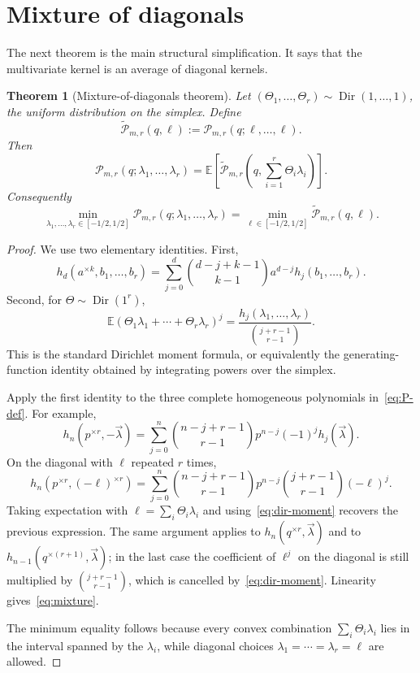 \documentclass[11pt]{article}
\newtheorem{theorem}{Theorem}[section]
\newcommand{\E}{\mathbb E}
\newcommand{\Pcal}{\mathcal P}
\newcommand{\wtP}{\widetilde{\mathcal P}}
\newcommand{\Dir}{\operatorname{Dir}}
\begin{document}
\section{Mixture of diagonals}

The next theorem is the main structural simplification.  It says that the multivariate kernel is an average of diagonal kernels.

\begin{theorem}[Mixture-of-diagonals theorem]\label{thm:mixture}
Let $(\Theta_1,\ldots,\Theta_r)\sim\Dir(1,\ldots,1)$, the uniform distribution on the simplex.  Define
\[
        \wtP_{m,r}(q,\ell):=\Pcal_{m,r}(q;\ell,\ldots,\ell).
\]
Then
\begin{equation}\label{eq:mixture}
        \Pcal_{m,r}(q;\lambda_1,\ldots,\lambda_r)
        =\E\left[\wtP_{m,r}\left(q,\sum_{i=1}^r\Theta_i\lambda_i\right)\right].
\end{equation}
Consequently
\[
        \min_{\lambda_1,\ldots,\lambda_r\in[-1/2,1/2]}
        \Pcal_{m,r}(q;\lambda_1,\ldots,\lambda_r)
        =\min_{\ell\in[-1/2,1/2]}\wtP_{m,r}(q,\ell).
\]
\end{theorem}

\begin{proof}
We use two elementary identities.  First,
\[
        h_d(a^{\times k},b_1,\ldots,b_r)
        =\sum_{j=0}^d\binom{d-j+k-1}{k-1}a^{d-j}h_j(b_1,\ldots,b_r).
\]
Second, for $\Theta\sim\Dir(1^r)$,
\begin{equation}\label{eq:dir-moment}
        \E(\Theta_1\lambda_1+\cdots+\Theta_r\lambda_r)^j
        =\frac{h_j(\lambda_1,\ldots,\lambda_r)}{\binom{j+r-1}{r-1}}.
\end{equation}
This is the standard Dirichlet moment formula, or equivalently the generating-function identity obtained by integrating powers over the simplex.

Apply the first identity to the three complete homogeneous polynomials in~\eqref{eq:P-def}.  For example,
\[
        h_n(p^{\times r},-\vec\lambda)
        =\sum_{j=0}^n\binom{n-j+r-1}{r-1}p^{n-j}(-1)^jh_j(\vec\lambda).
\]
On the diagonal with $\ell$ repeated $r$ times,
\[
        h_n(p^{\times r},(-\ell)^{\times r})
        =\sum_{j=0}^n\binom{n-j+r-1}{r-1}p^{n-j}\binom{j+r-1}{r-1}(-\ell)^j.
\]
Taking expectation with $\ell=\sum_i\Theta_i\lambda_i$ and using~\eqref{eq:dir-moment} recovers the previous expression.  The same argument applies to $h_n(q^{\times r},\vec\lambda)$ and to $h_{n-1}(q^{\times(r+1)},\vec\lambda)$; in the last case the coefficient of $\ell^j$ on the diagonal is still multiplied by $\binom{j+r-1}{r-1}$, which is cancelled by~\eqref{eq:dir-moment}.  Linearity gives~\eqref{eq:mixture}.

The minimum equality follows because every convex combination $\sum_i\Theta_i\lambda_i$ lies in the interval spanned by the $\lambda_i$, while diagonal choices $\lambda_1=\cdots=\lambda_r=\ell$ are allowed.
\end{proof}
\end{document}
